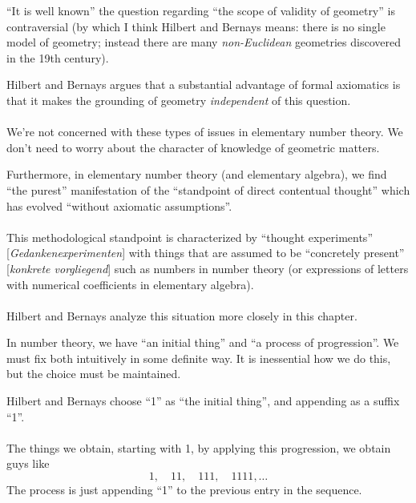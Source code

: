 ``It is well known'' the question regarding ``the scope of validity of
geometry'' is contraversial (by which I think Hilbert and Bernays
means: there is no single model of geometry; instead there are many
\emph{non-Euclidean} geometries discovered in the 19th century).

Hilbert and Bernays argues that a substantial advantage of formal
axiomatics is that it makes the grounding of geometry
\emph{independent} of this question.

\paragraph{} %
We're not concerned with these types of issues in elementary number
theory. We don't need to worry about the character of knowledge of
geometric matters.

Furthermore, in elementary number theory (and elementary algebra), we
find ``the purest'' manifestation of the ``standpoint of direct
contentual thought'' which has evolved ``without axiomatic assumptions''.

\paragraph{} %
This methodological standpoint is characterized by ``thought
experiments'' [\textit{Gedankenexperimenten\/}] with things that are
assumed to be ``concretely present'' [\textit{konkrete vorgliegend\/}]
such as numbers in number theory (or expressions of letters with
numerical coefficients in elementary algebra).

\paragraph{} %
Hilbert and Bernays analyze this situation more closely in this
chapter.

In number theory, we have ``an initial thing'' and ``a process of progression''.
We must fix both intuitively in some definite way. It is inessential
how we do this, but the choice must be maintained.

Hilbert and Bernays choose ``1'' as ``the initial thing'', and
appending as a suffix ``1''.

\paragraph{} %
The things we obtain, starting with 1, by applying this progression,
we obtain guys like
\begin{equation*}
1,\quad11,\quad111,\quad1111,\dots
\end{equation*}
The process is just appending ``1'' to the previous entry in the sequence.

